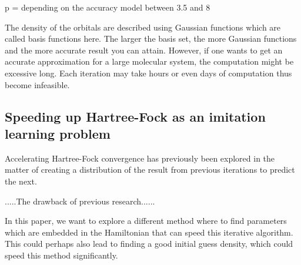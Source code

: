 \documentclass[twoside]{article}
\begin{document}
p  = depending on the accuracy model between 3.5 and 8\cite{frisch1996exploring}



The density of the orbitals are described using Gaussian functions which are called basis functions here. The larger the basis set, the more Gaussian functions and the more accurate result you can attain. However, if one wants to get an accurate approximation for a large molecular system, the computation might be excessive long. Each iteration may take hours or even days of computation thus become infeasible. 




\subsection{Speeding up Hartree-Fock as an imitation learning problem}


Accelerating Hartree-Fock convergence has previously been explored in the matter of creating a distribution of the result from previous iterations to predict the next\cite{Pulay1980}. 

.....The drawback of previous research......

In this paper,
we want to explore a different method where to find parameters which are embedded in the Hamiltonian that can speed this iterative algorithm. This could perhaps also lead to finding a good initial guess density, which could speed this method significantly. 




\end{document}
